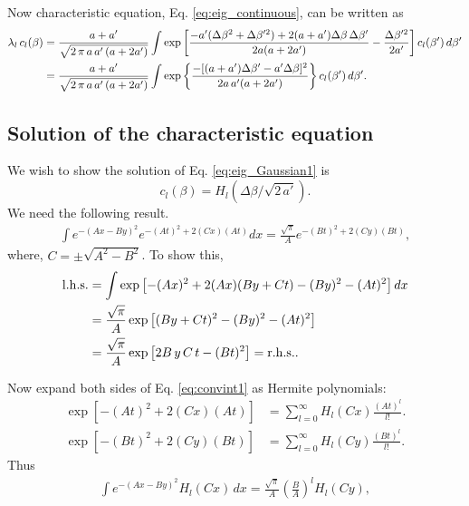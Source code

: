 \documentclass[aip,jcp,preprint,notitlepage, superscriptaddress]{revtex4-1}
\begin{document}
Now characteristic equation,
Eq. \eqref{eq:eig_continuous},
can be written as
%
\begin{align}
\lambda_l \, c_l(\beta)
&=
\frac{ a + a' } { \sqrt{2 \, \pi \, a \, a' \, (a + 2 a')} }
\int
\exp\left[
  \frac{
    -a' (\Delta \beta^2 + \Delta \beta'^2)
    +2(a+a') \Delta \beta \, \Delta \beta'
  }
  {
    2 a (a + 2 a')
  }
  -\frac{
    \Delta \beta'^2
  } { 2 a'}
\right]
c_l(\beta') \, d\beta'
\notag
\\
&=
\frac{ a + a' } { \sqrt{2 \, \pi \, a \, a' \, (a + 2 a')} }
\int
\exp\left\{
  \frac{
    -[(a + a') \Delta \beta' - a' \Delta \beta]^2
  }
  {
    2 a \, a' (a + 2 a')
  }
\right\}
c_l(\beta') \, d\beta'.
\label{eq:eig_Gaussian1}
\end{align}
%



\subsection{Solution of the characteristic equation}



We wish to show the solution of
Eq. \eqref{eq:eig_Gaussian1}
is
\begin{equation}
c_l(\beta) = H_l(\Delta\beta/\sqrt{2\,a'}).
\label{eq:cl_solution}
\end{equation}
%
We need the following result.
%
\begin{align}
\int
e^{
  -(A x - B y)^2
}
e^{
  -(A t)^2 + 2 (C x) (A t)
}
d x
=
\frac{ \sqrt \pi } { A }
e^{
  -(B t)^2 + 2 (C y) (B t)
},
\label{eq:convint1}
\end{align}
where,
$C = \pm\sqrt{A^2 - B^2}$.
%
To show this,
%
\begin{align*}
\mathrm{l.h.s.}
&=
\int
\exp\left[
  -(A x)^2 + 2 (A x) (B y + C t)
  -(B y)^2 -(A t)^2
\right]
d x
\notag \\
&=
\frac{ \sqrt \pi } { A }
\exp\left[
  (B y + C t)^2 - (B y)^2 - (A t)^2
\right]
\notag \\
&=
\frac{ \sqrt \pi }{ A }
\exp\left[
  2 B \, y \, C \, t - (B t)^2
\right]
=
\mathrm{r.h.s.}
.
\end{align*}



Now expand both sides of Eq. \eqref{eq:convint1}
as Hermite polynomials:
%
\begin{align*}
\exp\left[
  -(A t)^2 + 2 (C x) (A t)
\right]
&=
\sum_{l = 0}^\infty
  H_l(C x) \frac{ (A t)^l }{ l! }.
\\
\exp\left[
  -(B t)^2 + 2 (C y) (B t)
\right]
&=
\sum_{l = 0}^\infty
  H_l(C y) \frac{ (B t)^l }{ l! }.
\end{align*}
%
Thus
%
\begin{align}
\int
e^{
  -(A x - B y)^2
}
H_l(C x) \, d x
=
\frac{ \sqrt \pi } { A }
\left(
  \frac B A
\right)^l
H_l(C y),
\label{eq:convint1_Hermite}
\end{align}
\end{document}
